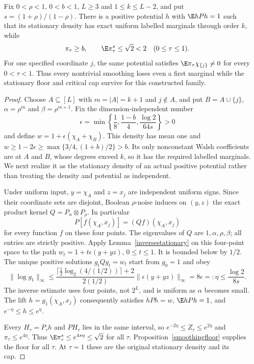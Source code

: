 \begin{theorem}\label{smoothingmatchingfailure}
Fix $0<\rho<1$, $0<b<1$, $L\geq3$ and $1\leq k\leq L-2$, and put
$s=(1+\rho)/(1-\rho)$. There is a positive potential $h$ with
$\E hPh=1$ such that its stationary density has exact uniform labelled
marginals through order $k$, while
\[
 \pi_\tau\geq b,\qquad \E\pi_\tau^s\leq\sqrt2<2
       \quad(0\leq\tau\leq1).
\]
For one specified coordinate $j$, the same potential satisfies
$\E\pi_\tau\chi_{\{j\}}\ne0$ for every $0<\tau<1$.
Thus every nontrivial smoothing loses even a first marginal while the
stationary floor and critical cap survive for this constructed family.
\end{theorem}
\begin{proof}
Choose $A\subseteq[L]$ with $m=|A|=k+1$ and $j\notin A$, and put
$B=A\cup\{j\}$, $\alpha=\rho^m$ and $\beta=\rho^{m+1}$.
Fix the dimension-independent number
\[
 \epsilon=\min\left\{\frac18,\frac{1-b}{4},
                         \frac{\log2}{64s}\right\}>0
\]
and define $w=1+\epsilon(\chi_A+\chi_B)$.
This density has mean one and
$w\geq1-2\epsilon\geq\max\{3/4,(1+b)/2\}>b$.
Its only nonconstant Walsh coefficients are at $A$ and $B$, whose
degrees exceed $k$, so it has the required labelled marginals.
We next realize it as the stationary density of an actual positive
potential rather than treating the density and potential as independent.

Under uniform input, $y=\chi_A$ and $z=x_j$ are independent uniform
signs. Since their coordinate sets are disjoint, Boolean $\rho$-noise
induces on $(y,z)$ the exact product kernel
$Q=P_\alpha\otimes P_\rho$. In particular
\[
 P[f(\chi_A,x_j)]=(Qf)(\chi_A,x_j)
\]
for every function $f$ on these four points. The eigenvalues of $Q$ are
$1,\alpha,\rho,\beta$; all entries are strictly positive.
Apply Lemma~\ref{inversestationary} on this four-point space to the path
$w_t=1+t\epsilon(y+yz)$, $0\leq t\leq1$. It is bounded below by $1/2$.
The unique positive solutions $g_tQg_t=w_t$ start from $g_0=1$ and obey
\[
 \|\log g_1\|_\infty
 \leq\frac{\lceil\tfrac12\log_2(4/(1/2))\rceil+2}{2(1/2)}
                  \|\epsilon(y+yz)\|_\infty
 =8\epsilon=:\eta\leq\frac{\log2}{8s}.
\]
The inverse estimate uses four points, not $2^L$, and is uniform as
$\alpha$ becomes small. The lift $h=g_1(\chi_A,x_j)$ consequently
satisfies $hPh=w$, $\E hPh=1$, and $e^{-\eta}\leq h\leq e^\eta$.

Every $H_\tau=P_\tau h$ and $PH_\tau$ lies in the same interval, so
$e^{-2\eta}\leq Z_\tau\leq e^{2\eta}$ and
$\pi_\tau\leq e^{4\eta}$. Thus
$\E\pi_\tau^s\leq e^{4s\eta}\leq\sqrt2$ for all $\tau$.
Proposition~\ref{smoothingfloor} supplies the floor for all $\tau$.
At $\tau=1$ these are the original stationary density and its cap.


\end{proof}

